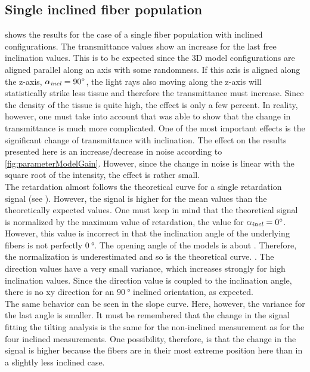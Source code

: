 \subsection{Single inclined fiber population}
 shows the results for the case of a single fiber population with inclined configurations.
The transmittance values show an increase for the last free inclination values.
This is to be expected since the 3D model configurations are aligned parallel along an axis with some randomness.
If this axis is aligned along the z-axis, \ie{} $\textnormal{$\alpha_{\mathit{incl}}$}=\SI{90}{\degree}$, the light rays also moving along the z-axis will statistically strike less tissue and therefore the transmittance must increase.
Since the density of the tissue is quite high, the effect is only a few percent.
In reality, however, one must take into account that \cite{Menzel2021} was able to show that the change in transmittance is much more complicated.
One of the most important effects is the significant change of transmittance with inclination.
The effect on the results presented here is an increase/decrease in noise according to \cref{fig:parameterModelGain}.
However, since the change in noise is linear with the square root of the intensity, the effect is rather small.
\\
% 
The retardation almost follows the theoretical curve for a single retardation signal (see ).
However, the signal is higher for the mean values than the theoretically expected values.
One must keep in mind that the theoretical signal is normalized by the maximum value of retardation, \ie{} the value for $\textnormal{$\alpha_{\mathit{incl}}$} = \SI{0}{\degree}$.
However, this value is incorrect in that the inclination angle of the underlying fibers is not perfectly $\SI{0}{\degree}$. The opening angle of the models is about \dummy{}.
Therefore, the normalization is underestimated and so is the theoretical curve.
\dummy{}.
% 
The direction values have a very small variance, which increases strongly for high inclination values.
Since the direction value is coupled to the inclination angle, there is no xy direction for an $\SI{90}{\degree}$ inclined orientation, as expected.
\\
% 
The same behavior can be seen in the slope curve.
Here, however, the variance for the last angle is smaller.
It must be remembered that the change in the signal fitting the tilting analysis is the same for the non-inclined measurement as for the four inclined measurements.
One possibility, therefore, is that the change in the signal is higher because the fibers are in their most extreme position here than in a slightly less inclined case.
